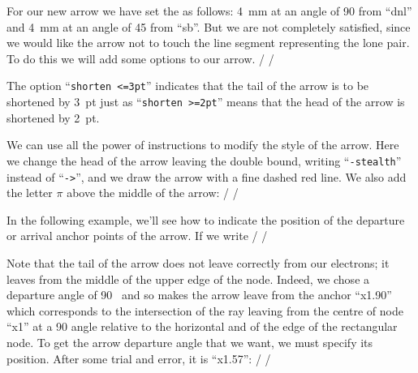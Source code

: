 \documentclass[10pt]{article}
\begin{document}
For our new arrow we have set the  as follows: 4~mm at an angle of 90\degres{} from ``dnl'' and 4~mm at an angle of 45\degres{} from ``sb''. But we are not completely satisfied, since we would like the arrow not to touch the line segment representing the lone pair. To do this we will add some options to our arrow.
/
\chemrel{<->}
/

The option ``\verb|shorten <=3pt|'' indicates that the tail of the arrow is to be shortened by 3~pt just as ``\verb|shorten >=2pt|'' means that the head of the arrow is shortened by 2~pt.

We can use all the power of \TIKZ instructions to modify the style of the arrow. Here we change the head of the arrow leaving the double bound, writing ``\verb|-stealth|'' instead of ``\verb|->|'', and we draw the arrow with a fine dashed red line. We also add the letter $\pi$ above the middle of the arrow:
/
\chemrel{<->}
/

In the following example, we'll see how to indicate the position of the departure or arrival anchor points of the arrow. If we write
/
\hspace{2cm}
/

Note that the tail of the arrow does not leave correctly from our electrons; it leaves from the middle of the upper edge of the node. Indeed, we chose a departure angle of 90~\degres{} and so \TIKZ makes the arrow leave from the anchor ``x1.90'' which corresponds to the intersection of the ray leaving from the centre of node ``x1'' at a 90\degres{} angle relative to the horizontal and of the edge of the rectangular node. To get the arrow departure angle that we want, we must specify its position. After some trial and error, it is ``x1.57'':
/
\hspace{2cm}
/
\end{document}
